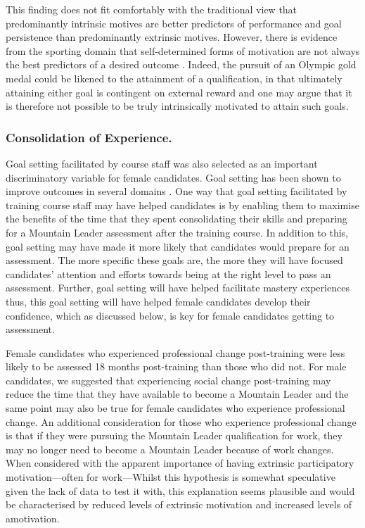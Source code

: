 \documentclass[
  12pt,
  a4paper,
]{book}
\begin{document}
This finding does not fit comfortably with the traditional view that predominantly intrinsic motives are better predictors of performance and goal persistence than predominantly extrinsic motives. However, there is evidence from the sporting domain that self-determined forms of motivation are not always the best predictors of a desired outcome \citep[e.g.,][]{Chantal1996, Fortier1995, Gullich2019, Hardy2017}. Indeed, the pursuit of an Olympic gold medal could be likened to the attainment of a qualification, in that ultimately attaining either goal is contingent on external reward and one may argue that it is therefore not possible to be truly intrinsically motivated to attain such goals.

\hypertarget{ml-pra-gta-female-consolidation-of-experience}{%
\subsubsection{Consolidation of Experience.}\label{ml-pra-gta-female-consolidation-of-experience}}

Goal setting facilitated by course staff was also selected as an important discriminatory variable for female candidates. Goal setting has been shown to improve outcomes in several domains \citep[see][ p 356]{Weinberg2014}. One way that goal setting facilitated by training course staff may have helped candidates is by enabling them to maximise the benefits of the time that they spent consolidating their skills and preparing for a Mountain Leader assessment after the training course. In addition to this, goal setting may have made it more likely that candidates would prepare for an assessment. The more specific these goals are, the more they will have focused candidates' attention and efforts towards being at the right level to pass an assessment. Further, goal setting will have helped facilitate mastery experiences thus, this goal setting will have helped female candidates develop their confidence, which as discussed below, is key for female candidates getting to assessment.

Female candidates who experienced professional change post-training were less likely to be assessed 18 months post-training than those who did not. For male candidates, we suggested that experiencing social change post-training may reduce the time that they have available to become a Mountain Leader and the same point may also be true for female candidates who experience professional change. An additional consideration for those who experience professional change is that if they were pursuing the Mountain Leader qualification for work, they may no longer need to become a Mountain Leader because of work changes. When considered with the apparent importance of having extrinsic participatory motivation---often for work---Whilst this hypothesis is somewhat speculative given the lack of data to test it with, this explanation seems plausible and would be characterised by reduced levels of extrinsic motivation and increased levels of amotivation.
\end{document}
